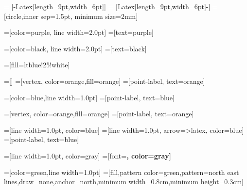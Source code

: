 \usetikzlibrary{positioning,arrows.meta,shapes,calc,patterns}

 = [-{Latex[length=9pt,width=6pt]}]
 = [{Latex[length=9pt,width=6pt]}-]
=[circle,inner sep=1.5pt, minimum size=2mm]

=[color=purple, line width=2.0pt]
=[text=purple]

=[color=black, line width=2.0pt]
=[text=black]

=[fill=ltblue!25!white]

=[]
=[vertex, color=orange,fill=orange]
=[point-label, text=orange]

=[color=blue,line width=1.0pt]
=[point-label, text=blue]


=[vertex, color=orange,fill=orange]
=[point-label, text=orange]

=[line width=1.0pt, color=blue]
=[line width=1.0pt, arrow=>latex, color=blue]
=[point-label, text=blue]


=[line width=1.0pt, color=gray]
=[font=\bfseries, color=gray]


=[color=green,line width=1.0pt]
=[fill,pattern color=green,pattern=north east lines,draw=none,anchor=north,minimum width=0.8cm,minimum height=0.3cm]

